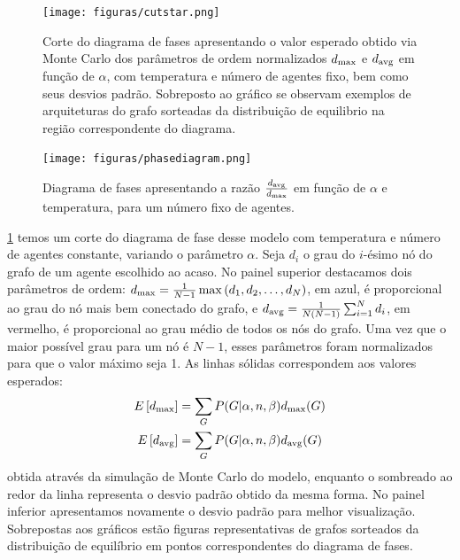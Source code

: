 \begin{figure}
  \texttt{[image: figuras/cutstar.png]}
  \caption[Corte do diagrama de fases apresentando o valor esperado dos parâmetros de ordem.]{Corte do diagrama de fases apresentando o valor esperado obtido via  Monte Carlo dos parâmetros de ordem normalizados $d_{\text{max}}$ e $d_{\text{avg}}$ em função de $\alpha$, com temperatura e número de agentes fixo, bem como seus desvios padrão. Sobreposto ao gráfico se observam exemplos de arquiteturas do grafo sorteadas da distribuição de equilibrio na região correspondente do diagrama. }
  \label{fig:cutstar}
\end{figure}
\begin{fullwidth}
\begin{figure}
	\texttt{[image: figuras/phasediagram.png]}
 	\caption{ Diagrama de fases apresentando a razão $\frac{d_{\text{avg}}}{d_{\text{max}}}$ em função de $\alpha$ e temperatura, para um número fixo de agentes.}
 	\label{fig:phasediagram}
\end{figure}
\end{fullwidth}
 \ref{fig:cutstar} temos um corte do diagrama de fase desse modelo com temperatura e número de agentes constante, variando o parâmetro $\alpha$. Seja $d_i$ o grau do $i$-ésimo nó do grafo de um agente escolhido ao acaso. No painel superior destacamos dois parâmetros de ordem: $d_{\text{max}} = \frac{1}{N-1}\max\left(d_1, d_2,\ldots, d_N\right)$, em azul, é proporcional ao grau do nó mais bem conectado do grafo, e $d_{\text{avg}} = \frac{1}{N(N-1)}\sum_{i=1}^N d_i$, em vermelho, é proporcional ao grau médio de todos os nós do grafo. Uma vez que o maior possível grau para um nó é $N-1$, esses parâmetros foram normalizados para que o valor máximo seja 1. As linhas sólidas correspondem aos valores esperados:
\begin{align}
E\left[d_{\text{max}}\right] &= \sum_{G} P(G | \alpha, n, \beta) d_{\text{max}}(G) \\
E\left[d_{\text{avg}}\right] &= \sum_{G} P(G | \alpha, n, \beta) d_{\text{avg}}(G)
\end{align}
obtida através da simulação de Monte Carlo do modelo, enquanto o sombreado ao redor da linha representa o desvio padrão obtido da mesma forma. No painel inferior apresentamos novamente o desvio padrão para melhor visualização. Sobrepostas aos gráficos estão figuras representativas de grafos sorteados da 
distribuição de equilíbrio em pontos correspondentes do diagrama de fases. 

